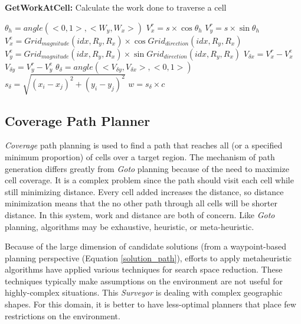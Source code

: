 \documentclass{tamuccthesis}
\begin{document}
\begin{spacing}{0.5}
\begin{algorithm}[H]
\caption[GetWorkAtCell]{\textbf{GetWorkAtCell:} Calculate the work done to traverse a cell} 
\label{alg:getworkatcell}
\SetAlgoVlined
{}
$\theta_h = angle(<0, 1>, <W_y, W_x>)$\;
$V^r_x = s \times \cos{\theta_h}$\;
$V^r_y = s \times \sin{\theta_h}$\;
$V^e_x = Grid_{magnitude}(idx, R_y, R_x) \times \cos{Grid_{direction}(idx, R_y, R_x)}$\;
$V^e_y = Grid_{magnitude}(idx, R_y, R_x) \times \sin{Grid_{direction}(idx, R_y, R_x)}$\;
$V_{\delta x} = V^r_x - V^e_x$\;
$V_{\delta y} = V^r_y - V^e_y$\;
$\theta_{\delta} = angle(<V_{\delta y}, V_{\delta x}>, <0, 1>)$\;
$s_{\delta} = \sqrt{(x_{i} - x_{j})^2 + (y_{i} - y_{j})^2}$\;
$w = s_{\delta} \times c$\;
\end{algorithm}
\end{spacing}


\subsection{Coverage Path Planner}

\textit{Coverage} path planning is used to find a path that reaches all (or a specified minimum proportion) of cells over a target region. The mechanism of path generation differs greatly from \textit{Goto} planning because of the need to maximize cell coverage. It is a complex problem since the path should visit each cell while still minimizing distance. Every cell added increases the distance, so distance minimization means that the no other path through all cells will be shorter distance. In this system, work and distance are both of concern. Like \textit{Goto} planning, algorithms may be exhaustive, heuristic, or meta-heuristic. 

Because of the large dimension of candidate solutions (from a waypoint-based planning perspective (Equation \ref{solution_path}), efforts to apply metaheuristic algorithms have applied various techniques for search space reduction. These techniques typically make assumptions on the environment are not useful for highly-complex situations. This \textit{Surveyor} is dealing with complex geographic shapes. For this domain, it is better to have less-optimal planners that place few restrictions on the environment. 
\end{document}
